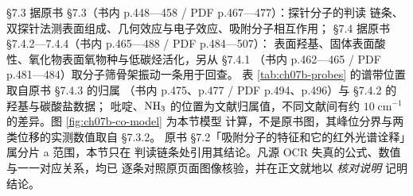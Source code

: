 \S 7.3 据原书 §7.3（书内 p.448—458 / PDF p.467—477）：探针分子的判读
链条、双探针法测表面组成、几何效应与电子效应、吸附分子相互作用；
\S 7.4 据原书 §7.4.2—7.4.4（书内 p.465—488 / PDF p.484—507）：
表面羟基、固体表面酸性、氧化物表面氧物种与低碳烃活化，另从 §7.4.1
（书内 p.462—465 / PDF p.481—484）取分子筛骨架振动一条用于回查。
表 \ref{tab:ch07b-probes} 的谱带位置取自原书 §7.4.3 的归属
（书内 p.475、p.477 / PDF p.494、p.496）与 §7.4.2 的羟基与碳酸盐数据；
吡啶、$\ce{NH3}$ 的位置为文献归属值，不同文献间有约
$10\;\mathrm{cm^{-1}}$ 的差异。图 \ref{fig:ch07b-co-model} 为本节模型
计算，不是原书图，其峰位分界与两类位移的实测数值取自 §7.3.2。
原书 §7.2「吸附分子的特征和它的红外光谱诠释」属分片 a 范围，本节只在
判读链条处引用其结论。凡源 OCR 失真的公式、数值与一一对应关系，均已
逐条对照原页面图像核验，并在正文就地以 \emph{核对说明} 记明结论。
